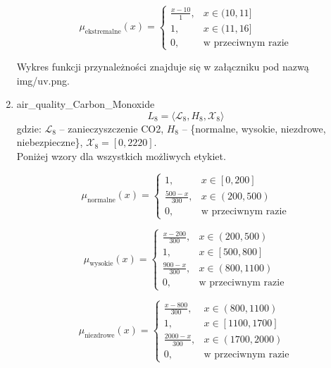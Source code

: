 \documentclass{article}
\begin{document}
\begin{enumerate}
    \begin{equation}
    \mu_{\text{ekstremalne}}(x) =
    \begin{cases}
    \frac{x - 10}{1}, & x \in (10, 11] \\
    1, & x \in (11, 16] \\
    0, & \text{w przeciwnym razie}
    \end{cases}
    \end{equation}

Wykres funkcji przynależności znajduje się w załączniku pod nazwą img/uv.png.

    \item air\_quality\_Carbon\_Monoxide
            \begin{equation}
            L_8 = \langle \mathcal{L}_8, H_8, \mathcal{X}_8 \rangle
        \end{equation}
        gdzie: $\mathcal{L}_8$ – zanieczyszczenie CO2, $H_8$ – \{normalne, wysokie, niezdrowe, niebezpieczne\}, $\mathcal{X}_8 = [0, 2220]$. \\
        Poniżej wzory dla wszystkich możliwych etykiet.

    \begin{equation}
    \mu_{\text{normalne}}(x) =
    \begin{cases}
    1, & x \in [0, 200] \\
    \frac{500 - x}{300}, & x \in (200, 500) \\
    0, & \text{w przeciwnym razie}
    \end{cases}
    \end{equation}

    \begin{equation}
    \mu_{\text{wysokie}}(x) =
    \begin{cases}
    \frac{x - 200}{300}, & x \in (200, 500) \\
    1, & x \in [500, 800] \\
    \frac{900 - x}{300}, & x \in (800, 1100) \\
    0, & \text{w przeciwnym razie}
    \end{cases}
    \end{equation}
    
    \begin{equation}
    \mu_{\text{niezdrowe}}(x) =
    \begin{cases}
    \frac{x - 800}{300}, & x \in (800, 1100) \\
    1, & x \in [1100, 1700] \\
    \frac{2000 - x}{300}, & x \in (1700, 2000) \\
    0, & \text{w przeciwnym razie}
    \end{cases}
    \end{equation}
    

\end{enumerate}
\end{document}
